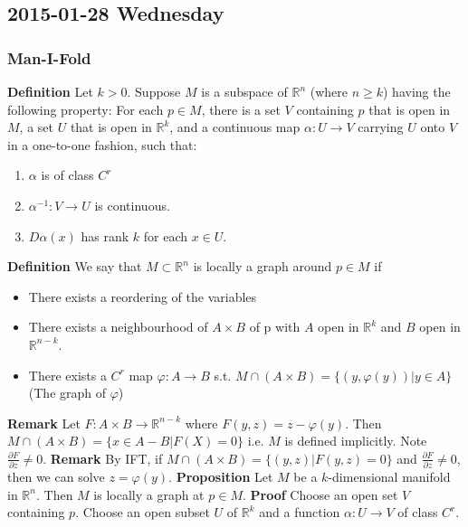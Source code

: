 
\subsection{2015-01-28 Wednesday}
\subsubsection{Man-I-Fold}

\textbf{Definition} Let $k > 0$. Suppose $M$ is a subspace of $\mathbb{R}^n$ (where $n \geq k$) having the following property: For each $p \in M$, there is a set $V$ containing $p$ that is open in $M$, a set $U$ that is open in $\mathbb{R}^k$, and a continuous map $\alpha:U \to V$ carrying $U$ onto $V$ in a one-to-one fashion, such that:
\begin{enumerate}
\item $\alpha$ is of class $C^r$
\item $\alpha^{-1}: V \to U$ is continuous.
\item $D\alpha(x)$ has rank $k$ for each $x \in U$.
\end{enumerate}
\textbf{Definition} We say that $M \subset \mathbb{R}^n$ is locally a graph around $p \in M$ if
\begin{itemize}
\item There exists a reordering of the variables
\item There exists a neighbourhood of $A \times B$ of p with $A$ open in $\mathbb{R}^k$ and $B$ open in $\mathbb{R}^{n-k}$.
\item There exists a $C^r$ map $\varphi: A \to B$ s.t. $M \cap (A \times B) = \{(y, \varphi(y))|y \in A\}$ (The graph of $\varphi$)
\end{itemize}
\textbf{Remark} Let $F: A \times B \to \mathbb{R}^{n-k}$ where $F(y, z) = z - \varphi(y)$. Then $M \cap (A \times B) = \{x \in A - B | F(X) = 0\}$ i.e. $M$ is defined implicitly. Note $\frac{\partial F}{\partial z} \neq 0$.
\newline\newline
\textbf{Remark} By IFT, if $M \cap (A \times B) = \{(y,z) | F(y, z) = 0\}$ and $\frac{\partial F}{\partial z} \neq 0$, then we can solve $z = \varphi(y)$.
\newline\newline
\textbf{Proposition} Let $M$ be a $k$-dimensional manifold in $\mathbb{R}^n$. Then $M$ is locally a graph at $p\in M$.
\newline\newline
\textbf{Proof} Choose an open set $V$ containing $p$. Choose an open subset $U$ of $\mathbb{R}^k$ and a function $\alpha: U \to V$ of class $C^r$.

